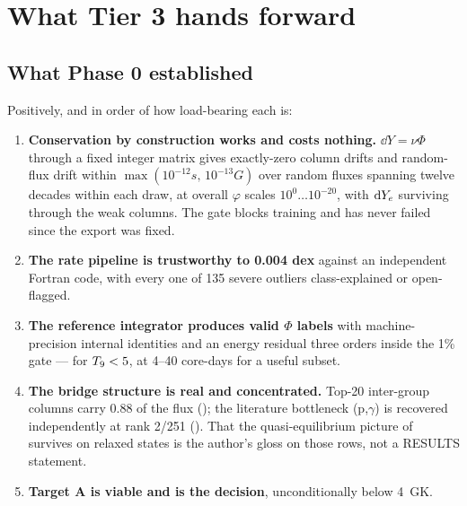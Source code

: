 %
%

\section{What Tier 3 hands forward}
\label{part:handoff}

\subsection{What Phase 0 established}
\label{sec:established}

Positively, and in order of how load-bearing each is:

\begin{enumerate}
\item \textbf{Conservation by construction works and costs nothing.}
  $\dd Y = \nu\Phi$ through a fixed integer matrix gives exactly-zero column
  drifts and random-flux drift within $\max(10^{-12}s,\,10^{-13}G)$ over random
  fluxes spanning twelve decades within each draw, at overall $\varphi$ scales
  $10^{0}\ldots10^{-20}$, with $\mathrm{d}Y_{e}$ surviving through the weak columns. The
  gate blocks training and has never failed since the export was fixed.
\item \textbf{The rate pipeline is trustworthy to 0.004 dex} against an
  independent Fortran code, with every one of 135 severe outliers
  class-explained or open-flagged. 
\item \textbf{The reference integrator produces valid $\Phi$ labels} with
  machine-precision internal identities and an energy residual three orders
  inside the 1\% gate --- for $T_{9} < 5$, at 4--40 core-days for a useful
  subset. 
\item \textbf{The bridge structure is real and concentrated.} Top-20
  inter-group columns carry 0.88 of the flux (); the literature
  bottleneck (p,$\gamma$)
  \citep{woosley1973, hix1996} is recovered independently at rank 2/251
  ().  That the quasi-equilibrium picture of
  \citet{bodansky1968} survives on relaxed states is the author's gloss on
  those rows, not a RESULTS statement.
\item \textbf{Target A is viable and is the decision}, unconditionally below
  4~GK.
\end{enumerate}

